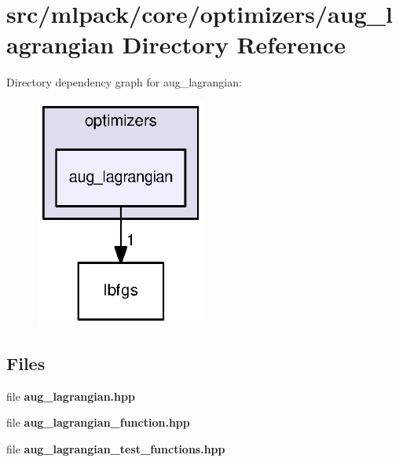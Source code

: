 \section{src/mlpack/core/optimizers/aug\+\_\+lagrangian Directory Reference}
\label{dir_ae31c4a0b67a7e5a42573da2deb29693}
Directory dependency graph for aug\+\_\+lagrangian\+:
\nopagebreak
\begin{figure}[H]
\begin{center}
\leavevmode
\includegraphics[width=158pt]{dir_ae31c4a0b67a7e5a42573da2deb29693_dep}
\end{center}
\end{figure}
\subsection*{Files}
\begin{DoxyCompactItemize}
\item 
file {\bf aug\+\_\+lagrangian.\+hpp}
\item 
file {\bf aug\+\_\+lagrangian\+\_\+function.\+hpp}
\item 
file {\bf aug\+\_\+lagrangian\+\_\+test\+\_\+functions.\+hpp}
\end{DoxyCompactItemize}
